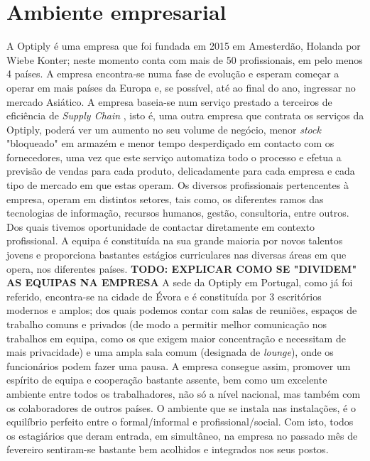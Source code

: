 \documentclass{article}
\begin{document}
\section{Ambiente empresarial}
\label{sec:amb-emp}
\hspace*{0.5cm} A Optiply é uma empresa que foi fundada em 2015 em Amesterdão, Holanda por Wiebe Konter; neste momento conta com mais de 50 profissionais, em pelo menos 4 países. A empresa encontra-se numa fase de evolução e esperam começar a operar em mais países da Europa e, se possível, até ao final do ano, ingressar no mercado Asiático. A empresa baseia-se num serviço prestado a terceiros de eficiência de \emph{Supply Chain} \cite{supp-chain}, isto é, uma outra empresa que contrata os serviços da Optiply, poderá ver um aumento no seu volume de negócio, menor \emph{stock} "bloqueado" em armazém e menor tempo desperdiçado em contacto com os fornecedores, uma vez que este serviço automatiza todo o processo e efetua a previsão de vendas para cada produto, delicadamente para cada empresa e cada tipo de mercado em que estas operam. \newline
\hspace*{0.5cm} Os diversos profissionais pertencentes à empresa, operam em distintos setores, tais como, os diferentes ramos das tecnologias de informação, recursos humanos, gestão, consultoria, entre outros. Dos quais tivemos oportunidade de contactar diretamente em contexto profissional. A equipa é constituída na sua grande maioria por novos talentos jovens e proporciona bastantes estágios curriculares nas diversas áreas em que opera, nos diferentes países. \textbf{TODO: EXPLICAR COMO SE "DIVIDEM" AS EQUIPAS NA EMPRESA}\newline
\hspace*{0.5cm} A sede da Optiply em Portugal, como já foi referido, encontra-se na cidade de Évora e é constituída por 3 escritórios modernos e amplos; dos quais podemos contar com salas de reuniões, espaços de trabalho comuns e privados (de modo a permitir melhor comunicação nos trabalhos em equipa, como os que exigem maior concentração e necessitam de mais privacidade) e uma ampla sala comum (designada de \emph{lounge}), onde os funcionários podem fazer uma pausa. A empresa consegue assim, promover um espírito de equipa e cooperação bastante assente, bem como um excelente ambiente entre todos os trabalhadores, não só a nível nacional, mas também com os colaboradores de outros países. O ambiente que se instala nas instalações, é o equilíbrio perfeito entre o formal/informal e profissional/social. Com isto, todos os estagiários que deram entrada, em simultâneo, na empresa no passado mês de fevereiro sentiram-se bastante bem acolhidos e integrados nos seus postos. \newline
\end{document}
